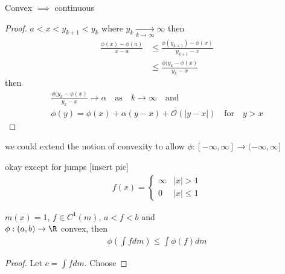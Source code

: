 \begin{lemma}
	Convex $\implies$ continuous
\end{lemma}

\begin{proof}
	$a < x < y_{k+1} < y_{k}$ where $y_{k} \xrightarrow[k \to \infty]{} \infty$ then
	\begin{align*}
		\frac{\phi(x) - \phi(a)}{x - a} &\leq \frac{\phi(y_{k+1}) - \phi (x)}{y_{k+1} - x} \\
										&\leq \frac{\phi(y_{k} - \phi(x)}{y_{k} - x}
	\end{align*} then
	\begin{align*}
		\frac{\phi(y_{k} - \phi(x)}{y_{k} - x} \to \alpha \quad \text{as} \quad k \to \infty \quad \text{and} \\
		\phi(y) = \phi(x) + \alpha (y - x) + \mathcal{O}( | y -x|) \quad \text{for} \quad y > x
	\end{align*} 
\end{proof}

\begin{remark}
	we could extend the notion of convexity to allow $\phi : [-\infty, \infty] \to (-\infty, \infty]$ 
	\begin{lemma}
		okay except for jumps [insert pic]
		\begin{align*}
			f(x) =
			\begin{cases}
				\infty & |x| > 1 \\
				0 &|x| \leq 1
			\end{cases}
		\end{align*} 
	\end{lemma}
	
\end{remark}

\begin{theorem}
	$m(x) = 1$, $f \in C^{1}(m)$, $a < f < b$ and \\ 
	$\phi : (a,b) \to \R$ convex, then
	\begin{align*}
		\phi\left(\int f dm \right) \leq \int \phi(f) dm
	\end{align*} 
\end{theorem}

\begin{proof}
	Let $c = \int f dm$. Choose
\end{proof}

